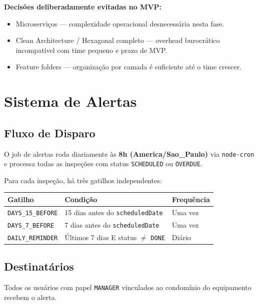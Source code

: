 \documentclass[12pt, a4paper]{article}
\begin{document}
\textbf{Decisões deliberadamente evitadas no MVP:}

\begin{itemize}[leftmargin=1.5em]
    \item Microserviços — complexidade operacional desnecessária nesta fase.
    \item Clean Architecture / Hexagonal completo — overhead burocrático incompatível com
    time pequeno e prazo de MVP.
    \item Feature folders — organização por camada é suficiente até o time crescer.
\end{itemize}

\vspace{0.5cm}

\section{Sistema de Alertas}
\label{sec:alertas}

\subsection{Fluxo de Disparo}

O job de alertas roda diariamente às \textbf{8h (America/Sao\_Paulo)} via \texttt{node-cron}
e processa todas as inspeções com status \texttt{SCHEDULED} ou \texttt{OVERDUE}.

Para cada inspeção, há três gatilhos independentes:

\begin{center}
\begin{tabular}{lll}
\toprule
\textbf{Gatilho} & \textbf{Condição} & \textbf{Frequência} \\
\midrule
\texttt{DAYS\_15\_BEFORE} & 15 dias antes do \texttt{scheduledDate} & Uma vez \\
\texttt{DAYS\_7\_BEFORE}  & 7 dias antes do \texttt{scheduledDate}  & Uma vez \\
\texttt{DAILY\_REMINDER}  & Últimos 7 dias E status $\neq$ \texttt{DONE} & Diário \\
\bottomrule
\end{tabular}
\end{center}

\subsection{Destinatários}

Todos os usuários com papel \texttt{MANAGER} vinculados ao condomínio do equipamento
recebem o alerta.
\end{document}
